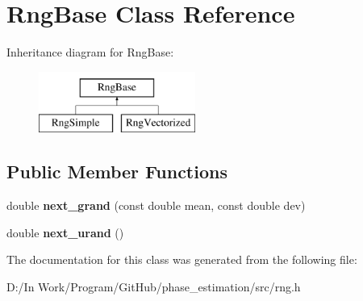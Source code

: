 \hypertarget{classRngBase}{}\section{Rng\+Base Class Reference}
\label{classRngBase}
Inheritance diagram for Rng\+Base\+:\begin{figure}[H]
\begin{center}
\leavevmode
\includegraphics[height=2.000000cm]{classRngBase}
\end{center}
\end{figure}
\subsection*{Public Member Functions}
\begin{DoxyCompactItemize}
\item 
\hypertarget{classRngBase_ae40580575c22cfea7833aca8a17deacb}{}double {\bfseries next\+\_\+grand} (const double mean, const double dev)\label{classRngBase_ae40580575c22cfea7833aca8a17deacb}

\item 
\hypertarget{classRngBase_a0a9093fa49916814b2a30c5292663a65}{}double {\bfseries next\+\_\+urand} ()\label{classRngBase_a0a9093fa49916814b2a30c5292663a65}

\end{DoxyCompactItemize}


The documentation for this class was generated from the following file\+:\begin{DoxyCompactItemize}
\item 
D\+:/\+In Work/\+Program/\+Git\+Hub/phase\+\_\+estimation/src/rng.\+h\end{DoxyCompactItemize}
